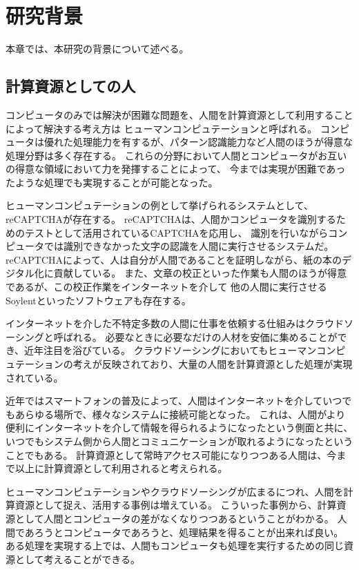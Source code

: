 \chapter{研究背景}\label{chap:background}

本章では、本研究の背景について述べる。

\section{計算資源としての人}\label{ux8a08ux7b97ux8cc7ux6e90ux3068ux3057ux3066ux306eux4eba}

コンピュータのみでは解決が困難な問題を、人間を計算資源として利用することによって解決する考え方は
ヒューマンコンピュテーション\cite{humancomputation}と呼ばれる。
コンピュータは優れた処理能力を有するが、パターン認識能力など人間のほうが得意な処理分野は多く存在する。
これらの分野において人間とコンピュータがお互いの得意な領域において力を発揮することによって、
今までは実現が困難であったような処理でも実現することが可能となった。

ヒューマンコンピュテーションの例として挙げられるシステムとして、reCAPTCHA\cite{recaptcha}が存在する。
reCAPTCHAは、人間かコンピュータを識別するためのテストとして活用されているCAPTCHA\cite{captcha}を応用し、
識別を行いながらコンピュータでは識別できなかった文字の認識を人間に実行させるシステムだ。
reCAPTCHAによって、人は自分が人間であることを証明しながら、紙の本のデジタル化に貢献している。
また、文章の校正といった作業も人間のほうが得意であるが、この校正作業をインターネットを介して
他の人間に実行させるSoylent\cite{soylent}といったソフトウェアも存在する。

インターネットを介した不特定多数の人間に仕事を依頼する仕組みはクラウドソーシング\cite{riseofcrowdsourcing}と呼ばれる。
必要なときに必要なだけの人材を安価に集めることができ、近年注目を浴びている。
クラウドソーシングにおいてもヒューマンコンピュテーションの考えが反映されており、大量の人間を計算資源とした処理が実現されている。

近年ではスマートフォンの普及によって、人間はインターネットを介していつでもあらゆる場所で、様々なシステムに接続可能となった。
これは、人間がより便利にインターネットを介して情報を得られるようになったという側面と共に、
いつでもシステム側から人間とコミュニケーションが取れるようになったということでもある。
計算資源として常時アクセス可能になりつつある人間は、今まで以上に計算資源として利用されると考えられる。

ヒューマンコンピュテーションやクラウドソーシングが広まるにつれ、人間を計算資源として捉え、活用する事例は増えている。
こういった事例から、計算資源として人間とコンピュータの差がなくなりつつあるということがわかる。
人間であろうとコンピュータであろうと、処理結果を得ることが出来れば良い。
ある処理を実現する上では、人間もコンピュータも処理を実行するための同じ資源として考えることができる。

